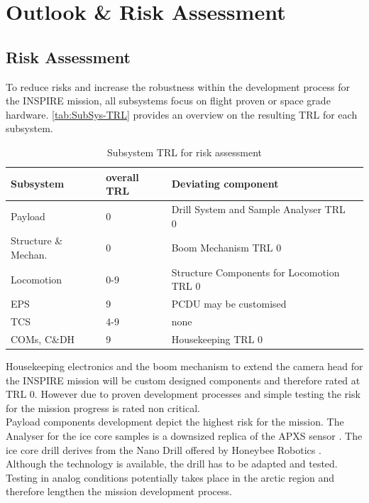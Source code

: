 \chapter{Outlook \& Risk Assessment}
\label{chap:outlook}

\section{Risk Assessment}
\label{sec:RiskAssessment}

To reduce risks and increase the robustness within the development process for the INSPIRE mission, all subsystems focus on flight proven or space grade hardware. \autoref{tab:SubSys-TRL} provides an overview on the resulting TRL for each subsystem. 
 
\begin{table}[h]
\centering
\caption{Subsystem TRL for risk assessment}
\begin{tabular}{llll}
\toprule
Subsystem            & overall TRL & Deviating component      &  \\
\midrule
Payload              & 0           & Drill System and Sample Analyser TRL 0 &  \\
Structure \& Mechan. & 0           & Boom Mechanism TRL 0     &  \\
Locomotion           & 0-9           & Structure Components for Locomotion TRL 0                     &  \\
EPS                  & 9           & PCDU may be customised                     &  \\
TCS                  & 4-9           & none                     &  \\
COMs, C\&DH          & 9           & Housekeeping TRL 0       & 	 \\
\bottomrule
\end{tabular}
\label{tab:SubSys-TRL}
\end{table}

Housekeeping electronics and the boom mechanism to extend the camera head for the INSPIRE mission will be custom designed components and therefore rated at TRL 0. However due to proven development processes and simple testing the risk for the mission progress is rated non critical.  \\

Payload components development depict the highest risk for the mission. The Analyser for the ice core samples is a downsized replica of the APXS sensor \cite{ref_pay_1, ref_pay_2}. 
The ice core drill derives from the Nano Drill offered by Honeybee Robotics \cite{6497188}. Although the technology is available, the drill has to be adapted and tested. Testing in analog conditions potentially takes place in the arctic region and therefore lengthen the mission development process. \\

